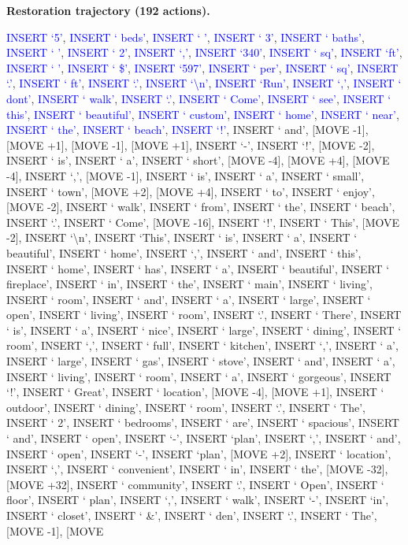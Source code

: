 \documentclass[11pt]{article}
\begin{document}
\vspace{0.4em}
\textbf{Restoration trajectory (192 actions).}\par
{
\ttfamily\scriptsize\raggedright\setlength{\parindent}{0pt}
\textcolor{blue}{INSERT `5'}, \textcolor{blue}{INSERT ` beds'}, \textcolor{blue}{INSERT ` \textbar{}'}, \textcolor{blue}{INSERT ` 3'}, \textcolor{blue}{INSERT ` baths'}, \textcolor{blue}{INSERT ` \textbar{}'}, \textcolor{blue}{INSERT ` 2'}, \textcolor{blue}{INSERT `,'}, \textcolor{blue}{INSERT `340'}, \textcolor{blue}{INSERT ` sq'}, \textcolor{blue}{INSERT `ft'}, \textcolor{blue}{INSERT ` \textbar{}'}, \textcolor{blue}{INSERT ` \$'}, \textcolor{blue}{INSERT `597'}, \textcolor{blue}{INSERT ` per'}, \textcolor{blue}{INSERT ` sq'}, \textcolor{blue}{INSERT `.'}, \textcolor{blue}{INSERT ` ft'}, \textcolor{blue}{INSERT `.'}, \textcolor{blue}{INSERT `\textbackslash{}n'}, \textcolor{blue}{INSERT `Run'}, \textcolor{blue}{INSERT `,'}, \textcolor{blue}{INSERT ` dont'}, \textcolor{blue}{INSERT ` walk'}, \textcolor{blue}{INSERT `.'}, \textcolor{blue}{INSERT ` Come'}, \textcolor{blue}{INSERT ` see'}, \textcolor{blue}{INSERT ` this'}, \textcolor{blue}{INSERT ` beautiful'}, \textcolor{blue}{INSERT ` custom'}, \textcolor{blue}{INSERT ` home'}, \textcolor{blue}{INSERT ` near'}, \textcolor{blue}{INSERT ` the'}, \textcolor{blue}{INSERT ` beach'}, \textcolor{blue}{INSERT `!'}, INSERT ` and', [MOVE -1], [MOVE +1], [MOVE -1], [MOVE +1], INSERT `-', INSERT `!', [MOVE -2], INSERT ` is', INSERT ` a', INSERT ` short', [MOVE -4], [MOVE +4], [MOVE -4], INSERT `,', [MOVE -1], INSERT ` is', INSERT ` a', INSERT ` small', INSERT ` town', [MOVE +2], [MOVE +4], INSERT ` to', INSERT ` enjoy', [MOVE -2], INSERT ` walk', INSERT ` from', INSERT ` the', INSERT ` beach', INSERT `.', INSERT ` Come', [MOVE -16], INSERT `!', INSERT ` This', [MOVE -2], INSERT `\textbackslash{}n', INSERT `This', INSERT ` is', INSERT ` a', INSERT ` beautiful', INSERT ` home', INSERT `,', INSERT ` and', INSERT ` this', INSERT ` home', INSERT ` has', INSERT ` a', INSERT ` beautiful', INSERT ` fireplace', INSERT ` in', INSERT ` the', INSERT ` main', INSERT ` living', INSERT ` room', INSERT ` and', INSERT ` a', INSERT ` large', INSERT ` open', INSERT ` living', INSERT ` room', INSERT `.', INSERT ` There', INSERT ` is', INSERT ` a', INSERT ` nice', INSERT ` large', INSERT ` dining', INSERT ` room', INSERT `,', INSERT ` full', INSERT ` kitchen', INSERT `,', INSERT ` a', INSERT ` large', INSERT ` gas', INSERT ` stove', INSERT ` and', INSERT ` a', INSERT ` living', INSERT ` room', INSERT ` a', INSERT ` gorgeous', INSERT `!', INSERT ` Great', INSERT ` location', [MOVE -4], [MOVE +1], INSERT ` outdoor', INSERT ` dining', INSERT ` room', INSERT `.', INSERT ` The', INSERT ` 2', INSERT ` bedrooms', INSERT ` are', INSERT ` spacious', INSERT ` and', INSERT ` open', INSERT `-', INSERT `plan', INSERT `,', INSERT ` and', INSERT ` open', INSERT `-', INSERT `plan', [MOVE +2], INSERT ` location', INSERT `,', INSERT ` convenient', INSERT ` in', INSERT ` the', [MOVE -32], [MOVE +32], INSERT ` community', INSERT `.', INSERT ` Open', INSERT ` floor', INSERT ` plan', INSERT `,', INSERT ` walk', INSERT `-', INSERT `in', INSERT ` closet', INSERT ` \&', INSERT ` den', INSERT `.', INSERT ` The', [MOVE -1], [MOVE }
\end{document}
